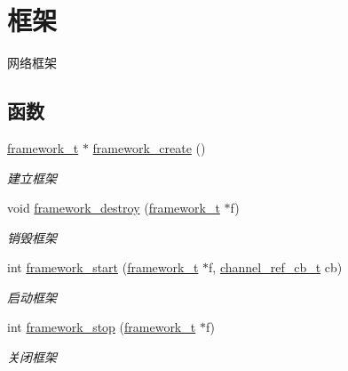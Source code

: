 \hypertarget{a00093}{}\section{框架}
\label{a00093}


网络框架  


\subsection*{函数}
\begin{DoxyCompactItemize}
\item 
\hyperlink{a00047_a6149d769f6f07ed14a40a271c95d8463_a6149d769f6f07ed14a40a271c95d8463}{framework\+\_\+t} $\ast$ \hyperlink{a00093_ga90b29a0c500209cb9b37437a32188a40_ga90b29a0c500209cb9b37437a32188a40}{framework\+\_\+create} ()
\begin{DoxyCompactList}\small\item\em 建立框架 \end{DoxyCompactList}\item 
void \hyperlink{a00093_gad1b6cb17014bfc515f8861bad3198e22_gad1b6cb17014bfc515f8861bad3198e22}{framework\+\_\+destroy} (\hyperlink{a00047_a6149d769f6f07ed14a40a271c95d8463_a6149d769f6f07ed14a40a271c95d8463}{framework\+\_\+t} $\ast$f)
\begin{DoxyCompactList}\small\item\em 销毁框架 \end{DoxyCompactList}\item 
int \hyperlink{a00093_ga7579f69fe8d0ec6887e4594f52cbb883_ga7579f69fe8d0ec6887e4594f52cbb883}{framework\+\_\+start} (\hyperlink{a00047_a6149d769f6f07ed14a40a271c95d8463_a6149d769f6f07ed14a40a271c95d8463}{framework\+\_\+t} $\ast$f, \hyperlink{a00047_ae296ec4d1ce108960de8dcc423956a1d_ae296ec4d1ce108960de8dcc423956a1d}{channel\+\_\+ref\+\_\+cb\+\_\+t} cb)
\begin{DoxyCompactList}\small\item\em 启动框架 \end{DoxyCompactList}\item 
int \hyperlink{a00093_ga429be76d09278d6170f1b519f4dbb689_ga429be76d09278d6170f1b519f4dbb689}{framework\+\_\+stop} (\hyperlink{a00047_a6149d769f6f07ed14a40a271c95d8463_a6149d769f6f07ed14a40a271c95d8463}{framework\+\_\+t} $\ast$f)
\begin{DoxyCompactList}\small\item\em 关闭框架 \end{DoxyCompactList}\item 

\end{DoxyCompactItemize}
